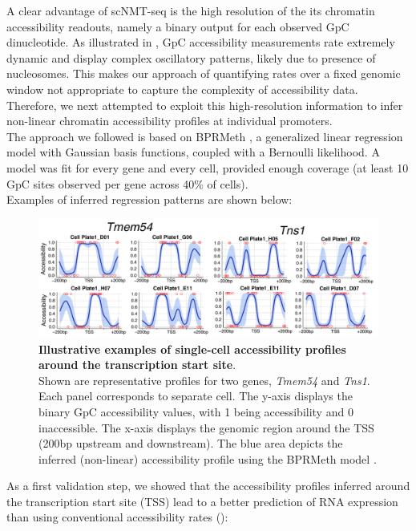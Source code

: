 A clear advantage of scNMT-seq is the high resolution of the its chromatin accessibility readouts, namely a binary output for each observed GpC dinucleotide. As illustrated in , GpC accessibility measurements rate extremely dynamic and display complex oscillatory patterns, likely due to presence of nucleosomes. This makes our approach of quantifying rates over a fixed genomic window not appropriate to capture the complexity of accessibility data. Therefore, we next attempted to exploit this high-resolution information to infer non-linear chromatin accessibility profiles at individual promoters.\\
The approach we followed is based on BPRMeth \cite{Kapourani2018}, a generalized linear regression model with Gaussian basis functions, coupled with a Bernoulli likelihood. A model was fit for every gene and every cell, provided enough coverage (at least 10 GpC sites observed per gene across 40\% of cells).\\
 Examples of inferred regression patterns are shown below:

\begin{figure}[H]
	\centering
	\includegraphics[width=0.9\linewidth]{scNMT_profiles_examples}
	\caption[]{\textbf{Illustrative examples of single-cell accessibility profiles around the transcription start site}.\\
	Shown are representative profiles for two genes, \textit{Tmem54} and \textit{Tns1}. Each panel corresponds to separate cell. The y-axis displays the binary GpC accessibility values, with 1 being accessibility and 0 inaccessible. The x-axis displays the genomic region around the TSS (200bp upstream and downstream). The blue area depicts the inferred (non-linear) accessibility profile using the BPRMeth model \cite{Kapourani2018}.}
	\label{fig:scnmt_profiles_examples}
\end{figure}

As a first validation step, we showed that the accessibility profiles inferred around the transcription start site (TSS) lead to a better prediction of RNA expression than using conventional accessibility rates ():

